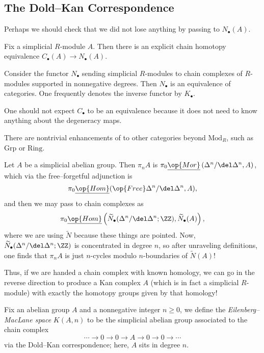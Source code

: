 \documentclass[../notes.tex]{subfiles}
\begin{document}
\subsection{The Dold--Kan Correspondence}
Perhaps we should check that we did not lose anything by passing to $N_\bullet(A)$.
\begin{theorem}
	Fix a simplicial $R$-module $A$. Then there is an explicit chain homotopy equivalence $C_\bullet(A)\to N_\bullet(A)$.
\end{theorem}
\begin{theorem} \label{thm:dold-kan}
	Consider the functor $N_\bullet$ sending simplicial $R$-modules to chain complexes of $R$-modules supported in nonnegative degrees. Then $N_\bullet$ is an equivalence of categories. One frequently denotes the inverse functor by $K_\bullet$.
\end{theorem}
\begin{remark}
	One should not expect $C_\bullet$ to be an equivalence because it does not need to know anything about the degeneracy maps.
\end{remark}
\begin{remark}
	There are nontrivial enhancements of  to other categories beyond $\mathrm{Mod}_R$, such as $\mathrm{Grp}$ or $\mathrm{Ring}$.
\end{remark}
\begin{example}
	Let $A$ be a simplicial abelian group. Then $\pi_nA$ is $\pi_0\underline{\op{Mor}}\left(\Delta^n/\del\Delta^n,A\right)$, which via the free--forgetful adjunction is
	\[\pi_0\underline{\op{Hom}}(\op{Free}\Delta^n/\del\Delta^n,A),\]
	and then we may pass to chain complexes as
	\[\pi_0\underline{\op{Hom}}\left(\widetilde N_\bullet(\Delta^n/\del\Delta^n;\ZZ),\widetilde N_\bullet(A)\right),\]
	where we are using $\widetilde N$ because these things are pointed. Now, $\widetilde N_\bullet(\Delta^n/\del\Delta^n;\ZZ)$ is concentrated in degree $n$, so after unraveling definitions, one finds that $\pi_nA$ is just $n$-cycles modulo $n$-boundaries of $\widetilde N(A)$!
\end{example}
Thus, if we are handed a chain complex with known homology, we can go in the reverse direction to produce a Kan complex $A$ (which is in fact a simplicial $R$-module) with exactly the homotopy groups given by that homology!
\begin{definition}
	Fix an abelian group $A$ and a nonnegative integer $n\ge0$, we define the \textit{Eilenberg--MacLane space} $K(A,n)$ to be the simplicial abelian group associated to the chain complex
	\[\cdots\to 0\to0\to A\to0\to0\to\cdots\]
	via the Dold--Kan correspondence; here, $A$ sits in degree $n$.
\end{definition}
\end{document}
